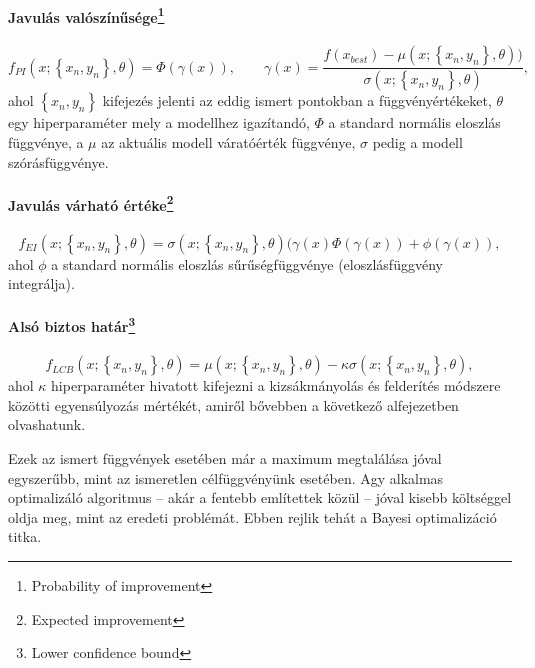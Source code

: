 \paragraph[Javulás valószínűsége]{Javulás valószínűsége\footnote{Probability of improvement}}
\begin{equation}
	\label{eq:POI}
	f_{PI}(x;\left\lbrace x_n,y_n\right\rbrace ,\theta)=\Phi(\gamma(x)), \qquad \gamma(x)=\frac{f(x_{best})-\mu(x;\left\lbrace x_n,y_n\right\rbrace ,\theta))}{\sigma(x; \left\lbrace x_n,y_n\right\rbrace ,\theta)},
\end{equation}
ahol $\left\lbrace x_n,y_n\right\rbrace$  kifejezés jelenti az eddig ismert pontokban a függvényértékeket, $\theta$ egy hiperparaméter mely a modellhez igazítandó, $\Phi$ a standard normális eloszlás függvénye, a  $\mu$ az aktuális modell váratóérték függvénye, $\sigma$ pedig a modell szórásfüggvénye.
\paragraph[Javulás várható értéke]{Javulás várható értéke\footnote{Expected improvement}}
\begin{equation}
	\label{eq:EI}
	f_{EI}(x;\left\lbrace x_n,y_n\right\rbrace ,\theta)=\sigma(x;\left\lbrace x_n,y_n\right\rbrace ,\theta)(\gamma(x)\Phi(\gamma(x))+\phi(\gamma(x)),
\end{equation}
ahol $\phi$ a standard normális eloszlás sűrűségfüggvénye (eloszlásfüggvény integrálja).
\paragraph[Alsó biztos határ]{Alsó biztos határ\footnote{Lower confidence bound}}
\begin{equation}
	\label{eq:LCB}
	f_{LCB}(x;\left\lbrace x_n,y_n\right\rbrace ,\theta)=\mu(x;\left\lbrace x_n,y_n\right\rbrace ,\theta)-\kappa \sigma(x;\left\lbrace x_n,y_n\right\rbrace ,\theta),
\end{equation}
ahol $\kappa$ hiperparaméter hivatott kifejezni a kizsákmányolás és felderítés módszere közötti egyensúlyozás mértékét, amiről bővebben a következő alfejezetben olvashatunk.

Ezek az ismert függvények esetében már a maximum megtalálása jóval egyszerűbb, mint az ismeretlen célfüggvényünk esetében. Agy alkalmas optimalizáló algoritmus -- akár a fentebb említettek közül -- jóval kisebb költséggel oldja meg, mint az eredeti problémát. Ebben rejlik tehát a Bayesi optimalizáció titka.

